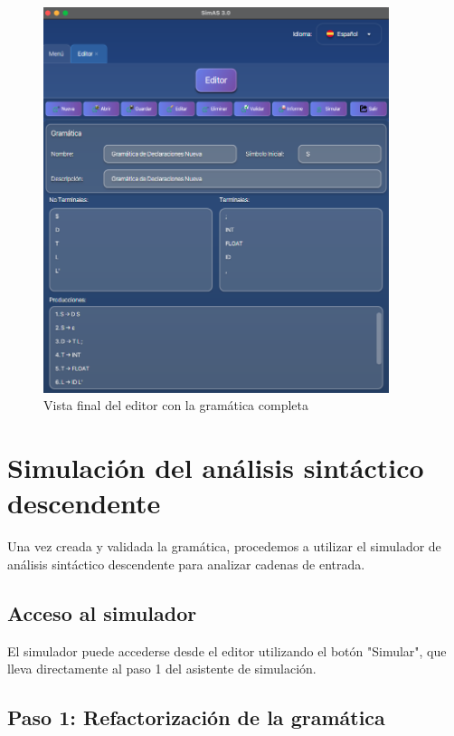 \needspace{8cm}
\begin{figure}[H]
    \centering
    \includegraphics[width=0.9\textwidth]{figuras/ejemplo_practico/editor.png}
    \caption{Vista final del editor con la gramática completa}
    \label{fig:ejemplo_editor_final}
\end{figure}

\section{Simulación del análisis sintáctico descendente}

Una vez creada y validada la gramática, procedemos a utilizar el simulador de análisis sintáctico descendente para analizar cadenas de entrada.

\subsection{Acceso al simulador}

El simulador puede accederse desde el editor utilizando el botón \string"Simular\string", que lleva directamente al paso 1 del asistente de simulación.

\subsection{Paso 1: Refactorización de la gramática}

